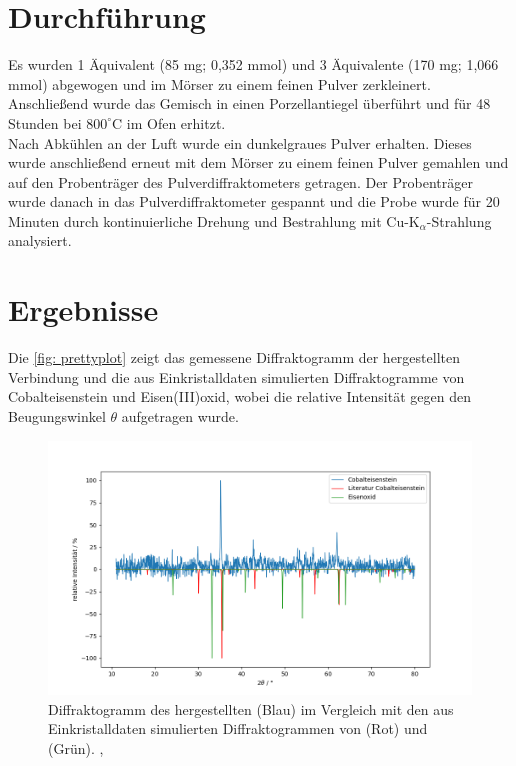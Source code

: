 \documentclass[a4paper,12pt,bibliography=totocnumbered]{scrartcl}
\begin{document}
\section{Durchführung}
Es wurden 1 Äquivalent (85 mg; 0,352 mmol) und 3 Äquivalente (170 mg; 1,066 mmol) abgewogen und im Mörser zu einem feinen Pulver zerkleinert. 
Anschließend wurde das Gemisch in einen Porzellantiegel überführt und für 48 Stunden bei $800 ^\circ$C im Ofen erhitzt.\\
Nach Abkühlen an der Luft wurde ein dunkelgraues Pulver erhalten. 
Dieses wurde anschließend erneut mit dem Mörser zu einem feinen Pulver gemahlen und auf den Probenträger des Pulverdiffraktometers getragen. 
Der Probenträger wurde danach in das Pulverdiffraktometer gespannt und die Probe wurde für 20 Minuten durch kontinuierliche Drehung und Bestrahlung mit Cu-K$_\alpha$-Strahlung analysiert.

\newpage

\section{Ergebnisse}
Die \autoref{fig: prettyplot} zeigt das gemessene Diffraktogramm der hergestellten Verbindung und 
die aus Einkristalldaten simulierten Diffraktogramme von Cobalteisenstein und Eisen(III)oxid, 
wobei die relative Intensität gegen den Beugungswinkel $\theta$ aufgetragen wurde. 
\begin{figure}[H]
    \centering
    \includegraphics[scale=0.65]{Bilder/messreihen.png}
    \caption{Diffraktogramm des hergestellten  (Blau) im Vergleich mit den aus Einkristalldaten simulierten Diffraktogrammen von  (Rot) und  (Grün). \cite{Rieck},\cite{FeDiff}}
    \label{fig: prettyplot}
\end{figure}
\end{document}
